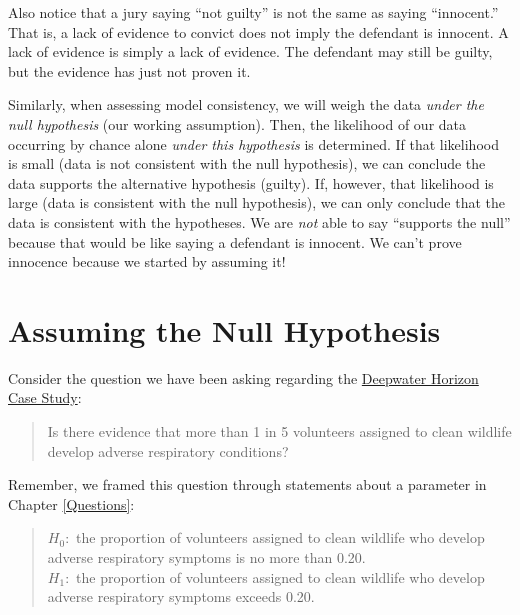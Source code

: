 \documentclass[
]{book}
\theoremstyle{plain}
\theoremstyle{mydefn}
\theoremstyle{myexmpl}
\theoremstyle{remark}
\begin{document}
Also notice that a jury saying ``not guilty'' is not the same as saying ``innocent.'' That is, a lack of evidence to convict does not imply the defendant is innocent. A lack of evidence is simply a lack of evidence. The defendant may still be guilty, but the evidence has just not proven it.

Similarly, when assessing model consistency, we will weigh the data \emph{under the null hypothesis} (our working assumption). Then, the likelihood of our data occurring by chance alone \emph{under this hypothesis} is determined. If that likelihood is small (data is not consistent with the null hypothesis), we can conclude the data supports the alternative hypothesis (guilty). If, however, that likelihood is large (data is consistent with the null hypothesis), we can only conclude that the data is consistent with the hypotheses. We are \emph{not} able to say ``supports the null'' because that would be like saying a defendant is innocent. We can't prove innocence because we started by assuming it!

\hypertarget{assuming-the-null-hypothesis}{%
\section{Assuming the Null Hypothesis}\label{assuming-the-null-hypothesis}}

Consider the question we have been asking regarding the \protect\hyperlink{CaseDeepwater}{Deepwater Horizon Case Study}:

\begin{quote}
Is there evidence that more than 1 in 5 volunteers assigned to clean wildlife develop adverse respiratory conditions?
\end{quote}

Remember, we framed this question through statements about a parameter in Chapter \ref{Questions}:

\begin{quote}
\(H_0:\) the proportion of volunteers assigned to clean wildlife who develop adverse respiratory symptoms is no more than 0.20.\\
\(H_1:\) the proportion of volunteers assigned to clean wildlife who develop adverse respiratory symptoms exceeds 0.20.
\end{quote}
\end{document}
